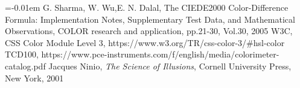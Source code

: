 \documentclass[portrait,final,a0paper]{baposter}
\begin{document}
\begin{poster}
{      \begin{thebibliography}{1}\itemsep=-0.01em
      \setlength{\baselineskip}{0.4em}
       G. Sharma, W. Wu,E. N. Dalal,
               The CIEDE2000 Color-Difference Formula:
               Implementation Notes, Supplementary Test Data, and
               Mathematical Observations, COLOR research and
               application, pp.21-30, Vol.30, 2005
       W3C, CSS Color Module Level 3,
               https://www.w3.org/TR/css-color-3/\#hsl-color
       TCD100,
       https://www.pce-instruments.com/f/english/media/colorimeter-catalog.pdf
       Jacques Ninio, {\em The Science of Illusions}, Cornell
	       University Press, New York, 2001 
      \end{thebibliography}
  }
\end{poster}
\end{document}
